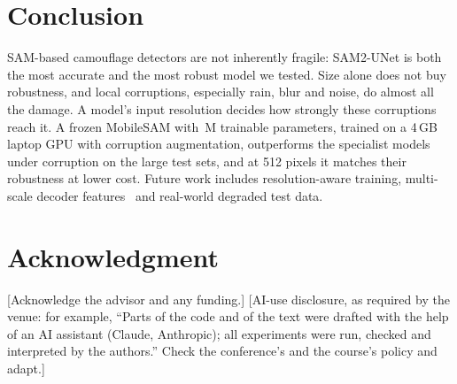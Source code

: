 \documentclass[conference]{IEEEtran}
\begin{document}
\section{Conclusion}
SAM-based camouflage detectors are not inherently fragile: SAM2-UNet is both the most accurate and the most robust model we tested. Size alone does not buy robustness, and local corruptions, especially rain, blur and noise, do almost all the damage. A model's input resolution decides how strongly these corruptions reach it. A frozen MobileSAM with \NParamsTrainable\,M trainable parameters, trained on a 4\,GB laptop GPU with corruption augmentation, outperforms the specialist models under corruption on the large test sets, and at 512 pixels it matches their robustness at lower cost. Future work includes resolution-aware training, multi-scale decoder features~\cite{ke2023hqsam} and real-world degraded test data.

\section*{Acknowledgment}
[Acknowledge the advisor and any funding.] [AI-use disclosure, as required by the venue: for example, ``Parts of the code and of the text were drafted with the help of an AI assistant (Claude, Anthropic); all experiments were run, checked and interpreted by the authors.'' Check the conference's and the course's policy and adapt.]



\end{document}
